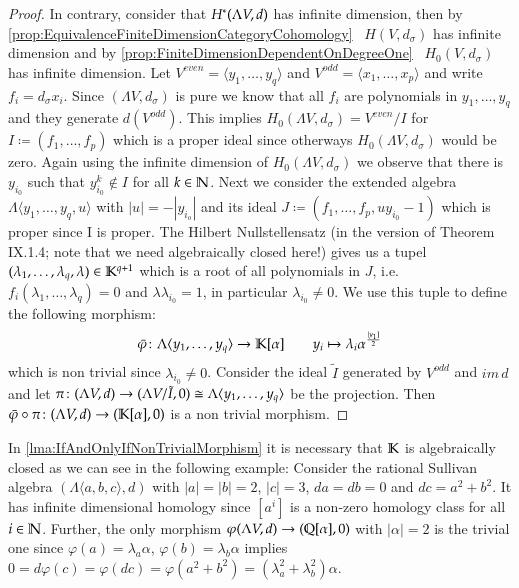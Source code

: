 \begin{proof}
  In contrary, consider that $H^*(\Lambda V,d)$ has infinite dimension, then by \ref{prop:EquivalenceFiniteDimensionCategoryCohomology}
  ~$H(V, d_{\sigma})$ has infinite dimension and by \ref{prop:FiniteDimensionDependentOnDegreeOne} ~$H_0(V, d_{\sigma})$ has
  infinite dimension. Let ${V^{even} = \langle y_1, \ldots , y_q \rangle}$ and 
  ${V^{odd} = \langle x_1 , \ldots , x_p \rangle}$ and write
  $f_i = d_{\sigma} x_i$. Since $(\Lambda V, d_{\sigma})$ is pure we know that all $f_i$ are 
  polynomials in $y_1, \ldots , y_q$ and they generate $d(V^{odd})$. This implies 
  $H_0(\Lambda V,d_{\sigma}) = V^{even} / I$ for $I \coloneqq (f_1, \ldots, f_p)$ which is a proper ideal since otherways
  $H_0(\Lambda V,d_{\sigma})$ would be zero. Again using the infinite dimension of 
  $H_0(\Lambda V,d_{\sigma})$ we observe that there is $y_{i_0}$ such that
  $y_{i_0}^k \notin I$ for all $k \in \mathbb{N}$. Next we consider the extended algebra 
  $\Lambda \langle y_1, \ldots, y_q, u \rangle$ with $|u| = - |y_{i_o}|$ and its ideal 
  $J \coloneqq (f_1, \ldots, f_p, u y_{i_0} - 1)$ which is proper since I is proper.
  The Hilbert Nullstellensatz (in the version of \cite{Lang2002} Theorem IX.1.4; note that we need algebraically closed here!)
   gives us a tupel 
  $(\lambda_1, \ldots, \lambda_q, \lambda) \in \mathbb{K}^{q+1}$ which is a root of all polynomials in $J$,
  i.e.\ $f_i(\lambda_1, \ldots, \lambda_q) = 0$ and $\lambda \lambda_{i_0} = 1$, in particular 
  $\lambda_{i_0} \neq 0$. We use this tuple to define the following morphism:
  $$ \bar{\varphi} \colon  \Lambda \langle y_1, \ldots, y_q \rangle \to \mathbb{K}[\alpha]
  \qquad y_i \mapsto \lambda_i \alpha^{\frac{|y_1]}{2}}$$
  which is non trivial since $\lambda_{i_0} \neq 0$. Consider the ideal $\tilde{I}$ generated by 
  $V^{odd}$ and $im \, d$ and let $\pi \colon (\Lambda V,d) \to (\Lambda V / \tilde{I} , 0) 
  \cong \Lambda \langle y_1, \ldots, y_q \rangle $ be the projection. Then 
  ${ \bar{\varphi} \circ \pi \colon (\Lambda V,d) \to (\mathbb{K}[\alpha], 0)}$ is a non trivial morphism.
 \end{proof}
 
 \begin{Remark}
  In \ref{lma:IfAndOnlyIfNonTrivialMorphism} it is necessary that $\mathbb{K}$ is algebraically closed 
  as we can see in the following example: \newline
  Consider the rational Sullivan algebra $(\Lambda \langle a, b, c \rangle,d)$ with $|a| = |b| = 2$, $|c| = 3$,
  $da = db = 0$ and $dc = a^2 + b^2$. It has infinite dimensional homology since $ [a^i]$ is a non-zero homology
  class for all $i \in \mathbb{N}$. Further, the only morphism $\varphi (\Lambda V,d) \to (\mathbb{Q}[\alpha], 0)$ with $|\alpha| = 2$ is the
  trivial one since $\varphi (a) = \lambda_a \alpha$, $\varphi (b) = \lambda_b \alpha$ implies 
  $ 0 = d\varphi (c) = \varphi(dc) = \varphi( a^2 + b^2) = (\lambda_a^2 + \lambda_b^2) \alpha$.
  
 \end{Remark}

